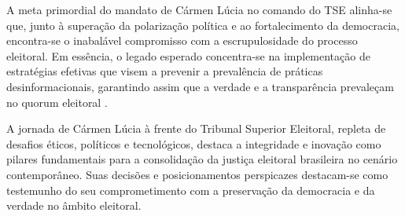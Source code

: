 \documentclass[
   article,       
   12pt,          
   oneside,       
   a4paper,       
   english,       
   brazil,        
   sumario=tradicional
   ]{abntex2}
\begin{document}
A meta primordial do mandato de Cármen Lúcia no comando do TSE alinha-se que, junto à superação da polarização política e ao fortalecimento da democracia, encontra-se o inabalável compromisso com a escrupulosidade do processo eleitoral. Em essência, o legado esperado concentra-se na implementação de estratégias efetivas que visem a prevenir a prevalência de práticas desinformacionais, garantindo assim que a verdade e a transparência prevaleçam no quorum eleitoral \cite{Quem_centraliza_poderes_em_uma_pessoa_chamase}.

A jornada de Cármen Lúcia à frente do Tribunal Superior Eleitoral, repleta de desafios éticos, políticos e tecnológicos, destaca a integridade e inovação como pilares fundamentais para a consolidação da justiça eleitoral brasileira no cenário contemporâneo. Suas decisões e posicionamentos perspicazes destacam-se como testemunho do seu comprometimento com a preservação da democracia e da verdade no âmbito eleitoral.
\postextual

\end{document}
